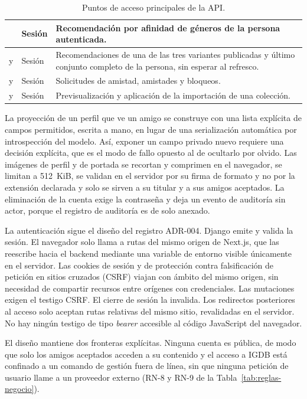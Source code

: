 \begin{table}[htbp]
\begin{tabularx}{\textwidth}{ | L{0.39\textwidth} | C{0.12\textwidth} | Y | }
    \hline
     & Sesión & Recomendación por afinidad de géneros de la persona autenticada. \\
    \hline
     y  & Sesión & Recomendaciones de una de las tres variantes publicadas y último conjunto completo de la persona, sin esperar al refresco. \\
    \hline
     y  & Sesión & Solicitudes de amistad, amistades y bloqueos. \\
    \hline
     y  & Sesión & Previsualización y aplicación de la importación de una colección. \\
    \hline
\end{tabularx}
\caption{Puntos de acceso principales de la API.}
\label{tab:endpoints}
\end{table}

La proyección de un perfil que ve un amigo se construye con una lista explícita de campos permitidos,
escrita a mano, en lugar de una serialización automática por introspección del modelo. Así,
exponer un campo privado nuevo requiere una decisión explícita, que es el modo de fallo
opuesto al de ocultarlo por olvido. Las imágenes de perfil y de portada se recortan y comprimen en el navegador, se limitan a 512~KiB, se validan en el servidor por su firma de formato y no por la extensión declarada y solo se sirven a su titular y a sus amigos aceptados. La eliminación de la cuenta exige la contraseña y deja un evento de auditoría sin actor, porque el registro de auditoría es de solo anexado.

La autenticación sigue el diseño del registro ADR-004. Django emite y valida la sesión. El
navegador solo llama a rutas del mismo origen de Next.js, que las reescribe hacia el backend
mediante una variable de entorno visible únicamente en el servidor. Las cookies de sesión y
de protección contra falsificación de petición en sitios cruzados (CSRF) viajan con ámbito
del mismo origen, sin necesidad de compartir recursos entre orígenes con credenciales. Las
mutaciones exigen el testigo CSRF. El cierre de sesión la invalida. Los redirectos
posteriores al acceso solo aceptan rutas relativas del mismo sitio, revalidadas en el
servidor. No hay ningún testigo de tipo \textit{bearer} accesible al código JavaScript del
navegador.

El diseño mantiene dos fronteras explícitas. Ninguna cuenta es pública, de modo que solo los
amigos aceptados acceden a su contenido y el acceso a IGDB está confinado a un comando de
gestión fuera de línea, sin que ninguna petición de usuario llame a un proveedor externo
(RN-8 y RN-9 de la Tabla~\ref{tab:reglas-negocio}).

